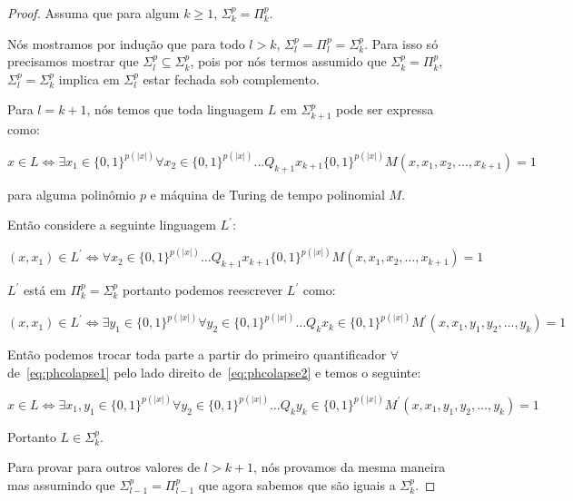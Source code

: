 \begin{proof}

\hfill

Assuma que para algum $k \geq 1$, $\Sigma_{k}^{p} = \Pi_{k}^{p}$.

Nós mostramos por indução que para todo $l > k$, $\Sigma_{l}^{p} = \Pi_{l}^{p} = \Sigma_{k}^{p}$. Para isso só precisamos mostrar que $\Sigma_{l}^{p} \subseteq \Sigma_{k}^{p}$, pois por nós termos assumido que $\Sigma_{k}^{p} = \Pi_{k}^{p}$, $\Sigma_{l}^{p} = \Sigma_{k}^{p}$ implica em $\Sigma_{l}^{p}$ estar fechada sob complemento.

Para $l = k + 1$, nós temos que toda linguagem $L$ em $\Sigma_{k + 1}^{p}$ pode ser expressa como:

\begin{equation} \label{eq:phcolapse1}
    x \in L \iff \exists x_{1} \in \{0, 1\}^{p(\lvert x \rvert)} \forall x_{2} \in \{0, 1\}^{p(\lvert x \rvert)} \dots Q_{k + 1} x_{k + 1} \{0, 1\}^{p(\lvert x \rvert)} M(x, x_{1}, x_{2}, \dots, x_{k + 1}) = 1
\end{equation}

para alguma polinômio $p$ e máquina de Turing de tempo polinomial $M$.

Então considere a seguinte linguagem $L^{\prime}$:

\begin{equation*}
    (x, x_{1}) \in L^{\prime} \iff \forall x_{2} \in \{0, 1\}^{p(\lvert x \rvert)} \dots Q_{k + 1} x_{k + 1} \{0, 1\}^{p(\lvert x \rvert)} M(x, x_{1}, x_{2}, \dots, x_{k + 1}) = 1
\end{equation*}

$L^{\prime}$ está em $\Pi_{k}^{p} = \Sigma_{k}^{p}$ portanto podemos reescrever $L^{\prime}$ como:

\begin{equation} \label{eq:phcolapse2}
    (x, x_{1}) \in L^{\prime} \iff \exists y_{1} \in \{0, 1\}^{p(\lvert x \rvert)} \forall y_{2} \in \{0, 1\}^{p(\lvert x \rvert)} \dots Q_{k} x_{k} \in \{0, 1\}^{p(\lvert x \rvert)} M^{\prime}(x, x_{1}, y_{1}, y_{2}, \dots, y_{k}) = 1
\end{equation}

Então podemos trocar toda parte a partir do primeiro quantificador $\forall$ de~\ref{eq:phcolapse1} pelo lado direito de~\ref{eq:phcolapse2} e temos o seguinte:

\begin{equation*}
    x \in L \iff \exists x_{1}, y_{1} \in \{0, 1\}^{p(\lvert x \rvert)} \forall y_{2} \in \{0, 1\}^{p(\lvert x \rvert)} \dots Q_{k} y_{k} \in \{0, 1\}^{p(\lvert x \rvert)} M^{\prime}(x, x_{1}, y_{1}, y_{2}, \dots, y_{k}) = 1
\end{equation*}


Portanto $L \in \Sigma_{k}^{p}$.

Para provar para outros valores de $l > k + 1$, nós provamos da mesma maneira mas assumindo que $\Sigma_{l - 1}^{p} = \Pi_{l - 1}^{p}$ que agora sabemos que são iguais a $\Sigma_{k}^{p}$.

\end{proof}

